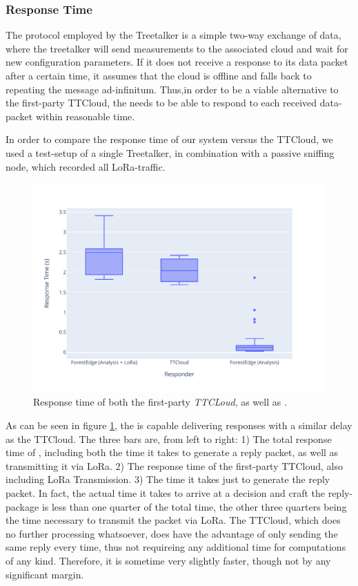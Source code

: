 \subsubsection{Response Time}
\label{sec:evaluation:response-time}

The protocol employed by the Treetalker is a simple two-way exchange of data, where the treetalker will send measurements to the associated cloud and wait for new configuration parameters.
If it does not receive a response to its data packet after a certain time, it assumes that the cloud is offline and falls back to repeating the message ad-infinitum.
Thus,in order to be a viable alternative to the first-party TTCloud, the \ttt needs to be able to respond to each received data-packet within reasonable time.

In order to compare the response time of our system versus the TTCloud, we used a test-setup of a single Treetalker, in combination with a passive sniffing node, which recorded all LoRa-traffic.

\begin{figure}
    \centering
    \includegraphics[width=\linewidth]{figures/response_times.pdf}
    \caption{Response time of both the first-party \textit{TTCLoud}, as well as \textit{\ttt}.}
    \label{fig:evaluation:ttt_response}
\end{figure}

As can be seen in figure \ref{fig:evaluation:ttt_response}, the \ttt is capable delivering responses with a similar delay as the TTCloud.
The three bars are, from left to right: 1) The total response time of \ttt, including both the time it takes to generate a reply packet, as well as transmitting it via LoRa. 2) The response time of the first-party TTCloud, also including LoRa Transmission. 3) The time it takes \ttt just to generate the reply packet.
In fact, the actual time it takes to arrive at a decision and craft the reply-package is less than one quarter of the total time, the other three quarters being the time necessary to transmit the packet via LoRa.
The TTCloud, which does no further processing whatsoever, does have the advantage of only sending the same reply every time, thus not requireing any additional time for computations of any kind.
Therefore, it is sometime very slightly faster, though not by any significant margin.

